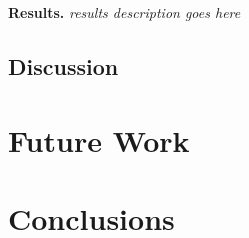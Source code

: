 \documentclass[conference]{IEEEtran}
\renewcommand{\paragraph}[1]{\vspace*{2pt}\noindent\textbf{#1}}
\begin{document}
\paragraph{Results.} \emph{results description goes here}

\subsection{Discussion}




\section{Future Work}


\section{Conclusions}
\end{document}
